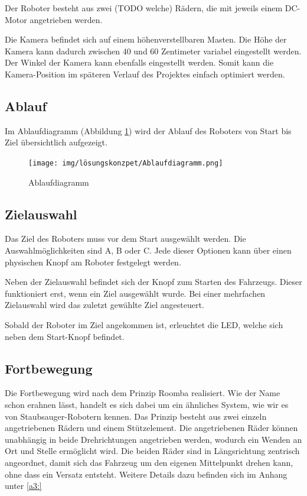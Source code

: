 \documentclass[../main.tex]{subfiles}
\begin{document}
Der Roboter besteht aus zwei (TODO welche) Rädern, die mit jeweils einem DC-Motor angetrieben werden.

Die Kamera befindet sich auf einem höhenverstellbaren Masten. Die Höhe der Kamera kann dadurch zwischen 40 und 60 Zentimeter variabel eingestellt werden. Der Winkel der Kamera kann ebenfalls eingestellt werden. Somit kann die Kamera-Position im späteren Verlauf des Projektes einfach optimiert werden.

\subsection{Ablauf}

Im Ablaufdiagramm (Abbildung \ref{img:ablaufdiagramm}) wird der Ablauf des Roboters von Start bis Ziel übersichtlich aufgezeigt.

\begin{figure}[H]
\texttt{[image: img/lösungskonzpet/Ablaufdiagramm.png]}
\caption{Ablaufdiagramm}
\label{img:ablaufdiagramm}
\end{figure}

\newpage
\subsection{Zielauswahl}

Das Ziel des Roboters muss vor dem Start ausgewählt werden. Die Auswahlmöglichkeiten sind A, B oder C. Jede dieser Optionen kann über einen physischen Knopf am Roboter festgelegt werden.

Neben der Zielauswahl befindet sich der Knopf zum Starten des Fahrzeugs. Dieser funktioniert erst, wenn ein Ziel ausgewählt wurde. Bei einer mehrfachen Zielauswahl wird das zuletzt gewählte Ziel angesteuert.

Sobald der Roboter im Ziel angekommen ist, erleuchtet die LED, welche sich neben dem Start-Knopf befindet. 

\subsection{Fortbewegung} 

Die Fortbewegung wird nach dem Prinzip Roomba realisiert. Wie der Name schon erahnen lässt, handelt es sich dabei um ein ähnliches System, wie wir es von Staubsauger-Robotern kennen. Das Prinzip besteht aus zwei einzeln angetriebenen Rädern und einem Stützelement. Die angetriebenen Räder können unabhängig in beide Drehrichtungen angetrieben werden, wodurch ein Wenden an Ort und Stelle ermöglicht wird. Die beiden Räder sind in Längsrichtung zentrisch angeordnet, damit sich das Fahrzeug um den eigenen Mittelpunkt drehen kann, ohne dass ein Versatz entsteht. Weitere Details dazu befinden sich im Anhang unter \ref{a3:}
\end{document}

